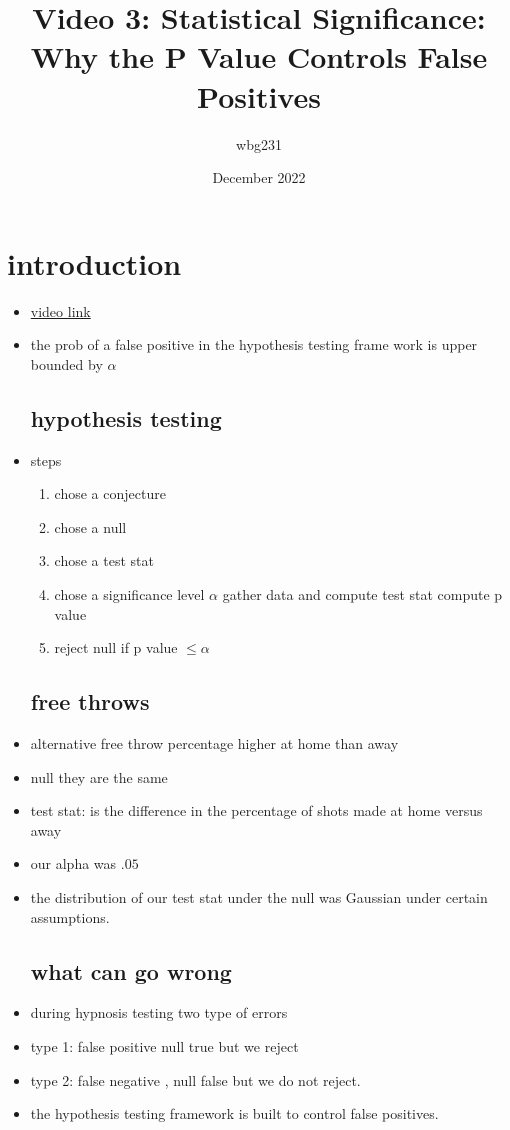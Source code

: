 \documentclass{article}
\title{Video 3: Statistical Significance: Why the P Value Controls False Positives}
\author{wbg231 }
\date{December 2022}
\begin{document}
\maketitle

\section{introduction}
\begin{itemize}
\item \href{https://www.youtube.com/watch?v=IYqGgHDVHDM&list=PLBEf5mJtE6KuZ5NBQMuWIMsiOOrV9ibzm&index=81&ab_channel=CarlosFernandez-Granda}{video link }
\item the prob of a false positive in the hypothesis testing frame work is upper bounded by $\alpha$
\subsection{hypothesis testing}
\item steps 
\begin{enumerate}
    \item chose a  conjecture 
    \item chose a null 
    \item chose a test stat 
    \item chose a significance level $\alpha$
    \itme gather data and compute test stat 
    \itme compute p value 
    \item reject null if p value $\leq \alpha$
\end{enumerate}
\subsection{free throws }
\item alternative free throw percentage higher at home than away 
\item null they are the same 
\item test stat: is the difference in the percentage of shots made at home versus away 
\item our alpha was $.05$
\item the distribution of our test stat under the null was Gaussian under certain assumptions.
\subsection{what can go wrong}
\item during hypnosis testing two type of errors 
\item type 1: false positive null true but we reject 
\item type 2: false negative , null false but we do not reject. 
\item the hypothesis testing framework is built to control false positives. 

\end{itemize}
\end{document}
